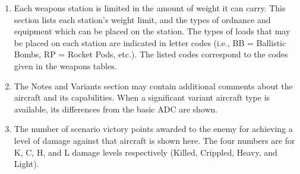 \begin{enumerate}[resume]
    \item {}
        Each weapons station is limited in the amount of weight it can carry. This section lists each station's weight limit, and the types of ordnance and equipment which can be placed on the station. The types of loads that may be placed on each station are indicated in letter codes (i.e., BB = Ballistic Bombs, RP = Rocket Pods, etc.). The listed codes correspond to the codes given in the weapons tables.

    \item {}
        The Notes and Variants section may contain additional comments about the aircraft and its capabilities. When a significant variant aircraft type is available, its differences from the basic ADC are shown.

    \item {}
        The number of scenario victory points awarded to the enemy for achieving a level of damage against that aircraft is shown here. The four numbers are for K, C, H, and L damage levels respectively (Killed, Crippled, Heavy, and Light).

\end{enumerate}

